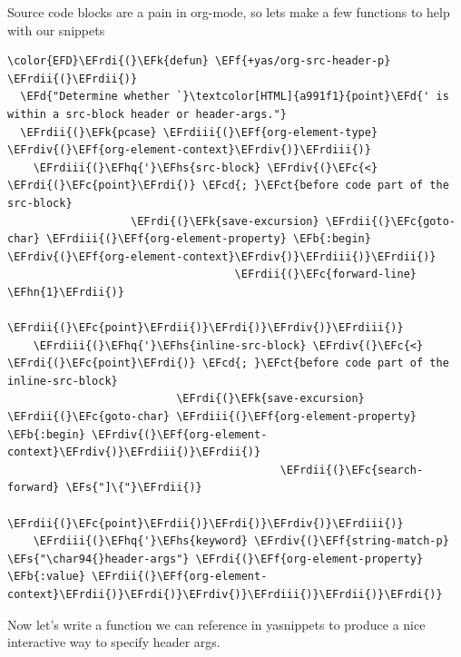 \documentclass{scrartcl}
\newcommand{\EFk}[1]{\textcolor{EFk}{#1}} %
\newcommand{\EFd}[1]{\textcolor{EFd}{#1}} %
\newcommand{\EFs}[1]{\textcolor{EFs}{#1}} %
\newcommand{\EFb}[1]{\textcolor{EFb}{#1}} %
\newcommand{\EFct}[1]{\textcolor{EFct}{#1}} %
\newcommand{\EFc}[1]{\textcolor{EFc}{#1}} %
\newcommand{\EFf}[1]{\textcolor{EFf}{#1}} %
\newcommand{\EFcd}[1]{\textcolor{EFcd}{#1}} %
\newcommand{\EFhn}[1]{#1} %
\newcommand{\EFhq}[1]{#1} %
\newcommand{\EFhs}[1]{#1} %
\newcommand{\EFrdi}[1]{#1} %
\newcommand{\EFrdii}[1]{#1} %
\newcommand{\EFrdiii}[1]{#1} %
\newcommand{\EFrdiv}[1]{#1} %
\begin{document}
Source code blocks are a pain in org-mode, so lets make a few functions to help
with our snippets
\begin{Code}
\begin{Verbatim}[]
\color{EFD}\EFrdi{(}\EFk{defun} \EFf{+yas/org-src-header-p} \EFrdii{(}\EFrdii{)}
  \EFd{"Determine whether `}\textcolor[HTML]{a991f1}{point}\EFd{' is within a src-block header or header-args."}
  \EFrdii{(}\EFk{pcase} \EFrdiii{(}\EFf{org-element-type} \EFrdiv{(}\EFf{org-element-context}\EFrdiv{)}\EFrdiii{)}
    \EFrdiii{(}\EFhq{'}\EFhs{src-block} \EFrdiv{(}\EFc{<} \EFrdi{(}\EFc{point}\EFrdi{)} \EFcd{; }\EFct{before code part of the src-block}
                   \EFrdi{(}\EFk{save-excursion} \EFrdii{(}\EFc{goto-char} \EFrdiii{(}\EFf{org-element-property} \EFb{:begin} \EFrdiv{(}\EFf{org-element-context}\EFrdiv{)}\EFrdiii{)}\EFrdii{)}
                                   \EFrdii{(}\EFc{forward-line} \EFhn{1}\EFrdii{)}
                                   \EFrdii{(}\EFc{point}\EFrdii{)}\EFrdi{)}\EFrdiv{)}\EFrdiii{)}
    \EFrdiii{(}\EFhq{'}\EFhs{inline-src-block} \EFrdiv{(}\EFc{<} \EFrdi{(}\EFc{point}\EFrdi{)} \EFcd{; }\EFct{before code part of the inline-src-block}
                          \EFrdi{(}\EFk{save-excursion} \EFrdii{(}\EFc{goto-char} \EFrdiii{(}\EFf{org-element-property} \EFb{:begin} \EFrdiv{(}\EFf{org-element-context}\EFrdiv{)}\EFrdiii{)}\EFrdii{)}
                                          \EFrdii{(}\EFc{search-forward} \EFs{"]\{"}\EFrdii{)}
                                          \EFrdii{(}\EFc{point}\EFrdii{)}\EFrdi{)}\EFrdiv{)}\EFrdiii{)}
    \EFrdiii{(}\EFhq{'}\EFhs{keyword} \EFrdiv{(}\EFf{string-match-p} \EFs{"\char94{}header-args"} \EFrdi{(}\EFf{org-element-property} \EFb{:value} \EFrdii{(}\EFf{org-element-context}\EFrdii{)}\EFrdi{)}\EFrdiv{)}\EFrdiii{)}\EFrdii{)}\EFrdi{)}
\end{Verbatim}
\end{Code}

Now let's write a function we can reference in yasnippets to produce a nice
interactive way to specify header args.
\end{document}
